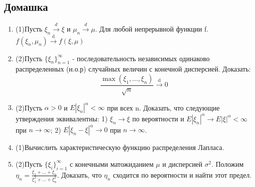 \documentclass[a4paper, 14pt]{extarticle}
\begin{document}
\subsection*{Домашка}
\begin{enumerate}

\item (1)Пусть $\xi_n \overset{d}{\to} \xi$ и $\mu_n \overset{d}{\to} \mu$. Для любой непрерывной функции f.
$f(\xi_n,\mu_n) \overset{\textrm{d}}{\to} f(\xi, \mu)$

\item (2)Пусть $\{\xi_n\}_{n=1}^{\infty}$ - последовательность независимых одинаково распределенных (н.о.р) случайных величин
с конечной дисперсией. Доказать:
$$\frac{\max{(\xi_1, \ldots, \xi_n)}}{\sqrt{n}} \overset{\textrm{d}}{\to} 0$$

\item (2)Пусть $\alpha > 0$ и $E|\xi_n|^\alpha < \infty$ при всех n. Доказать, что следующие
утверждения эквивалентны:
1) $\xi_n \to \xi$ по вероятности и $E|\xi_n|^\alpha \to E|\xi|^\alpha < \infty$ при $n \to \infty$;
2) $E|\xi_n - \xi|^\alpha \to 0$ при $n \to \infty$. 

\item (1)Вычислить характеристическую функцию распределения Лапласа.


\item (2)Пусть $\{\xi_i\}_{i=1}^{\infty}$ с конечными матожиданием $\mu$ и дисперсией $\sigma^2$. 
Положим $\eta_n = \frac{\xi_1 + \ldots + \xi_n}{\xi_1^2 + \ldots + \xi_n^2}$. Доказать, что $\eta_n$ сходится по вероятности и найти этот предел.






\end{enumerate}
\end{document}
